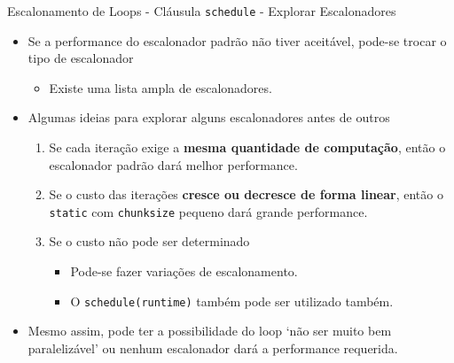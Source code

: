	\begin{frame}{Escalonamento de Loops - Cláusula {\tt schedule} - Explorar Escalonadores}
		\begin{itemize}
			\setlength\itemsep{1em}
			\item Se a performance do escalonador padrão não tiver aceitável, pode-se trocar o tipo de escalonador
			\begin{itemize}
				\item Existe uma lista ampla de escalonadores.
			\end{itemize}
			\item Algumas ideias para explorar alguns escalonadores antes de outros
			\begin{enumerate}
				\setlength\itemsep{0.8em}
				\item Se cada iteração exige a \textbf{mesma quantidade de computação}, então o escalonador padrão dará melhor performance.
				\item Se o custo das iterações \textbf{cresce ou decresce de forma linear}, então o {\tt static} com {\tt chunksize} pequeno dará grande performance.
				\item Se o custo não pode ser determinado
				\begin{itemize}
				 	\item Pode-se fazer variações de escalonamento. 
				 	\item O {\tt schedule(runtime)} também pode ser utilizado também.
				 \end{itemize} 
			\end{enumerate}
					\bigskip
					\pause
			\item Mesmo assim, pode ter a possibilidade do loop `não ser muito bem paralelizável' ou nenhum escalonador dará a performance requerida.
		\end{itemize}
	\end{frame}










